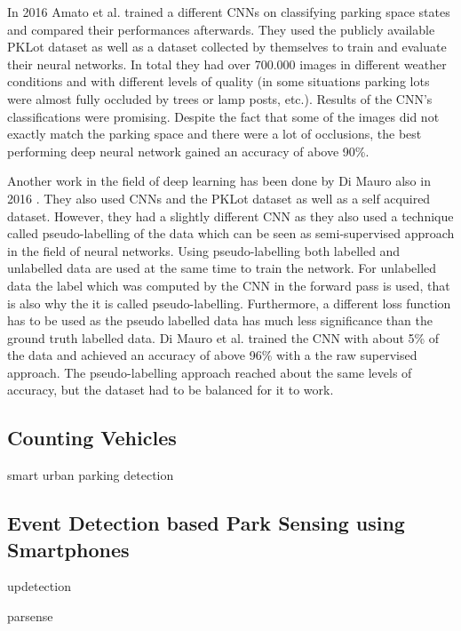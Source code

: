 In 2016 Amato et al. \cite{Amato2016} trained a different CNNs on classifying parking space states and compared their performances afterwards. They used the publicly available PKLot dataset as well as a dataset collected by themselves to train and evaluate their neural networks. In total they had over 700.000 images in different weather conditions and with different levels of quality (in some situations parking lots were almost fully occluded by trees or lamp posts, etc.). Results of the CNN's classifications were promising. Despite the fact that some of the images did not exactly match the parking space and there were a lot of occlusions, the best performing deep neural network gained an accuracy of above 90\%. 

Another work in the field of deep learning has been done by Di Mauro also in 2016 \cite{DiMauro2016}. They also used CNNs and the PKLot dataset as well as a self acquired dataset. However, they had a slightly different CNN as they also used a technique called pseudo-labelling of the data which can be seen as semi-supervised approach in the field of neural networks. Using pseudo-labelling both labelled and unlabelled data are used at the same time to train the network. For unlabelled data the label which was computed by the CNN in the forward pass is used, that is also why the it is called pseudo-labelling. Furthermore, a different loss function has to be used as the pseudo labelled data has much less significance than the ground truth labelled data. Di Mauro et al. trained the CNN with about 5\% of the data and achieved an accuracy of above 96\% with a the raw supervised approach. The pseudo-labelling approach reached about the same levels of accuracy, but the dataset had to be balanced for it to work.




\subsection{Counting Vehicles}
\label{sec:counting_in_out_park_sensing}
smart urban parking detection \cite{smarturbanparkingdetection}

\subsection{Event Detection based Park Sensing using Smartphones}
\label{sec:event_detection_park_sensing}

updetection\cite{Ma:2014:USP:2674918.2674929}

parsense \cite{Nawaz:2013:PSB:2500423.2500438}

